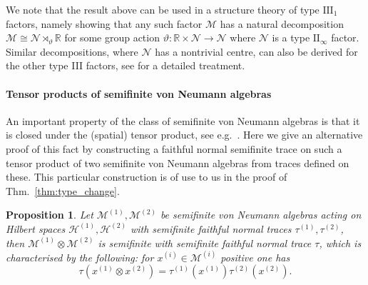 \documentclass[sn-mathphys-num]{sn-jnl}%
\newcommand{\RR}{\mathbb{R}}
\newcommand{\HH}{\mathcal{H}}
\newcommand{\MM}{\mathcal{M}}
\numberwithin{equation}{section}
\theoremstyle{thmstyleone}%
\newtheorem{proposition}[theorem]{Proposition}%
\theoremstyle{thmstyletwo}%
\theoremstyle{thmstylethree}%
\begin{document}
    We note that the result above can be used in a structure theory of type $\mathrm{III}_1$ factors, namely showing that any such factor $\MM$ has a natural decomposition $\MM\cong \mathcal{N}\rtimes_\vartheta\RR$ for some group action $\vartheta:\RR\times\mathcal{N}\to\mathcal{N}$ where $\mathcal{N}$ is a type $\mathrm{II}_\infty$ factor. Similar decompositions, where $\mathcal{N}$ has a nontrivial centre, can also be derived for the other type III factors, see \cite[Ch.\ XII]{takesaki2002} for a detailed treatment.

    \paragraph{Tensor products of semifinite von Neumann algebras}
    An important property of the class of semifinite von Neumann algebras is that it is closed under the (spatial) tensor product, see e.g.\ \cite[Thm.\ V.2.30]{Takesaki2001}. Here we give an alternative proof of this fact by constructing a faithful normal semifinite trace on such a tensor product of two semifinite von Neumann algebras from traces defined on these. This particular construction is of use to us in the proof of Thm.\ \ref{thm:type_change}.
    \begin{proposition}
    \label{prop:trace_product}
    Let $\MM^{(1)},\MM^{(2)}$ be semifinite von Neumann algebras acting on Hilbert spaces $\HH^{(1)},\HH^{(2)}$ with semifinite faithful normal traces $\tau^{(1)},\tau^{(2)}$, then $\MM^{(1)}\otimes\MM^{(2)}$ is semifinite with semifinite faithful normal trace $\tau$, which is characterised by the following: for $x^{(i)}\in \MM^{(i)}$ positive one has
    \begin{equation}
        \tau(x^{(1)}\otimes x^{(2)})=\tau^{(1)}(x^{(1)})\tau^{(2)}(x^{(2)}).
    \end{equation}
    \end{proposition}
\end{document}
